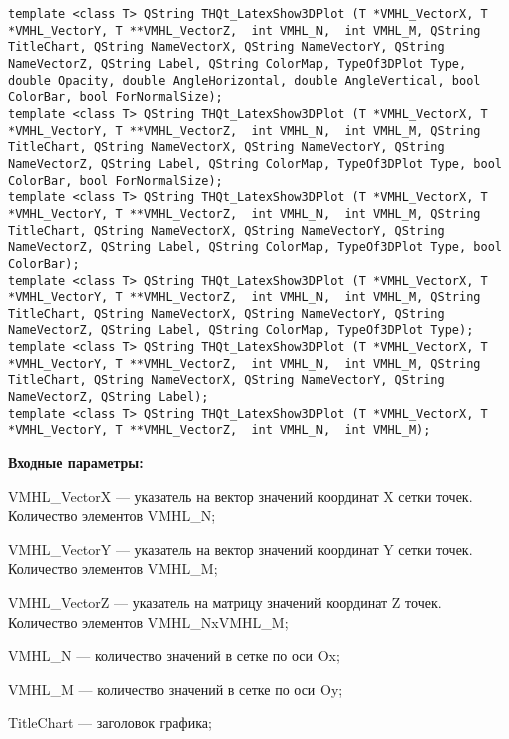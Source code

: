 \documentclass[a4paper,12pt]{article}
\begin{document}
\begin{lstlisting}[label=code_syntax_THQt_LatexShow3DPlot,caption=Синтаксис]
template <class T> QString THQt_LatexShow3DPlot (T *VMHL_VectorX, T *VMHL_VectorY, T **VMHL_VectorZ,  int VMHL_N,  int VMHL_M, QString TitleChart, QString NameVectorX, QString NameVectorY, QString NameVectorZ, QString Label, QString ColorMap, TypeOf3DPlot Type, double Opacity, double AngleHorizontal, double AngleVertical, bool ColorBar, bool ForNormalSize);
template <class T> QString THQt_LatexShow3DPlot (T *VMHL_VectorX, T *VMHL_VectorY, T **VMHL_VectorZ,  int VMHL_N,  int VMHL_M, QString TitleChart, QString NameVectorX, QString NameVectorY, QString NameVectorZ, QString Label, QString ColorMap, TypeOf3DPlot Type, bool ColorBar, bool ForNormalSize);
template <class T> QString THQt_LatexShow3DPlot (T *VMHL_VectorX, T *VMHL_VectorY, T **VMHL_VectorZ,  int VMHL_N,  int VMHL_M, QString TitleChart, QString NameVectorX, QString NameVectorY, QString NameVectorZ, QString Label, QString ColorMap, TypeOf3DPlot Type, bool ColorBar);
template <class T> QString THQt_LatexShow3DPlot (T *VMHL_VectorX, T *VMHL_VectorY, T **VMHL_VectorZ,  int VMHL_N,  int VMHL_M, QString TitleChart, QString NameVectorX, QString NameVectorY, QString NameVectorZ, QString Label, QString ColorMap, TypeOf3DPlot Type);
template <class T> QString THQt_LatexShow3DPlot (T *VMHL_VectorX, T *VMHL_VectorY, T **VMHL_VectorZ,  int VMHL_N,  int VMHL_M, QString TitleChart, QString NameVectorX, QString NameVectorY, QString NameVectorZ, QString Label);
template <class T> QString THQt_LatexShow3DPlot (T *VMHL_VectorX, T *VMHL_VectorY, T **VMHL_VectorZ,  int VMHL_N,  int VMHL_M);
\end{lstlisting}

\textbf{Входные параметры:}
 

 
    VMHL\_VectorX --- указатель на вектор значений координат X сетки точек. Количество элементов VMHL\_N;
 
    VMHL\_VectorY --- указатель на вектор значений координат Y сетки точек. Количество элементов VMHL\_M;
 
    VMHL\_VectorZ --- указатель на матрицу значений координат Z точек. Количество элементов VMHL\_NxVMHL\_M;
 
    VMHL\_N --- количество значений в сетке по оси Ox;
 
    VMHL\_M --- количество значений в сетке по оси Oy;
 
    TitleChart --- заголовок графика;
 
\end{document}
